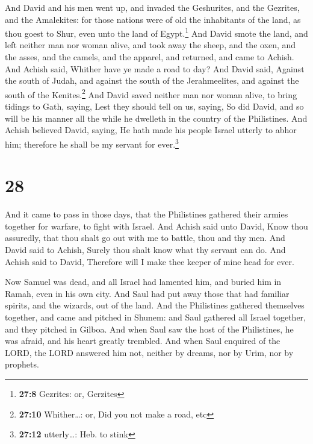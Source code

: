  And David and his men went up, and invaded the
Geshurites, and the Gezrites, and the Amalekites: for those nations were
of old the inhabitants of the land, as thou goest to Shur, even unto the
land of Egypt.\footnote{\textbf{27:8} Gezrites: or, Gerzites}
 And David smote the land, and left neither man nor woman
alive, and took away the sheep, and the oxen, and the asses, and the
camels, and the apparel, and returned, and came to Achish.
 And Achish said, Whither have ye made a road to day? And
David said, Against the south of Judah, and against the south of the
Jerahmeelites, and against the south of the Kenites.\footnote{\textbf{27:10}
  Whither\ldots: or, Did you not make a road, etc}  And
David saved neither man nor woman alive, to bring tidings to Gath,
saying, Lest they should tell on us, saying, So did David, and so will
be his manner all the while he dwelleth in the country of the
Philistines.  And Achish believed David, saying, He hath
made his people Israel utterly to abhor him; therefore he shall be my
servant for ever.\footnote{\textbf{27:12} utterly\ldots: Heb. to stink}

\hypertarget{section-27}{%
\section{28}\label{section-27}}

 And it came to pass in those days, that the Philistines
gathered their armies together for warfare, to fight with Israel. And
Achish said unto David, Know thou assuredly, that thou shalt go out with
me to battle, thou and thy men.  And David said to Achish,
Surely thou shalt know what thy servant can do. And Achish said to
David, Therefore will I make thee keeper of mine head for ever.

 Now Samuel was dead, and all Israel had lamented him, and
buried him in Ramah, even in his own city. And Saul had put away those
that had familiar spirits, and the wizards, out of the land.
 And the Philistines gathered themselves together, and
came and pitched in Shunem: and Saul gathered all Israel together, and
they pitched in Gilboa.  And when Saul saw the host of the
Philistines, he was afraid, and his heart greatly trembled.
 And when Saul enquired of the LORD, the LORD answered him
not, neither by dreams, nor by Urim, nor by prophets.

